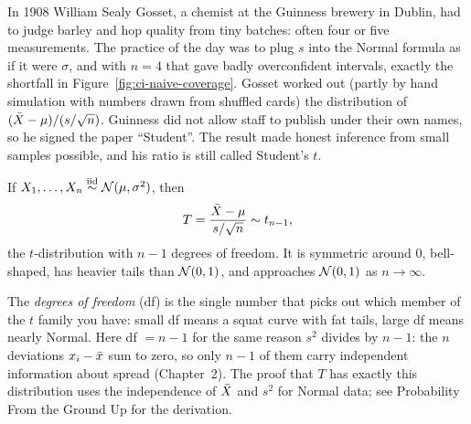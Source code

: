 \begin{historybox}
In 1908 William Sealy Gosset, a chemist at the Guinness brewery in Dublin,
had to judge barley and hop quality from tiny batches: often four or five
measurements. The practice of the day was to plug $s$ into the Normal formula as if it were
$\sigma$, and with $n=4$ that gave badly overconfident intervals, exactly the shortfall in
Figure~\ref{fig:ci-naive-coverage}. Gosset worked out (partly by hand
simulation with numbers drawn from shuffled cards) the distribution of
$(\bar{X}-\mu)/(s/\sqrt n)$. Guinness did not allow staff to publish under their
own names, so he signed the paper ``Student''. The result made honest
inference from small samples possible, and his ratio is still called Student's
$t$.
\end{historybox}

\begin{theorem}[Student's t]
If $X_1,\dots,X_n \overset{\text{iid}}{\sim} \mathcal{N}(\mu,\sigma^2)$, then
\[
  T = \frac{\bar{X}-\mu}{s/\sqrt n} \sim t_{n-1},
\]
the $t$-distribution with $n-1$ degrees of freedom. It is symmetric around 0,
bell-shaped, has heavier tails than $\mathcal{N}(0,1)$, and approaches
$\mathcal{N}(0,1)$ as $n\to\infty$.
\end{theorem}

The \emph{degrees of freedom} (df) is the single number that picks out which
member of the $t$ family you have: small df means a squat curve with fat tails,
large df means nearly Normal. Here df $=n-1$ for the same reason $s^2$ divides by $n-1$:
the $n$ deviations $x_i - \bar{x}$ sum to zero, so only $n-1$ of them carry
independent information about spread (Chapter~2). The proof that $T$ has
exactly this distribution uses the independence of $\bar{X}$ and $s^2$ for Normal
data; see Probability From the Ground Up for the derivation.

